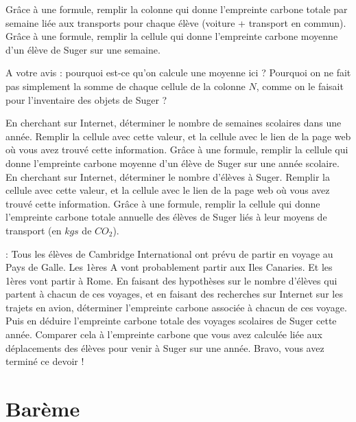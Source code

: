 \documentclass{exam}
\begin{document}
\begin{questions}
  \question Grâce à une formule, remplir la colonne  qui donne l'empreinte carbone totale par semaine liée aux transports pour chaque élève (voiture + transport en commun).
  \question Grâce à une formule, remplir la cellule  qui donne l'empreinte carbone moyenne d'un élève de Suger sur une semaine.
  \begin{Indication}
    A votre avis : pourquoi est-ce qu'on calcule une moyenne ici ? Pourquoi on ne fait pas simplement la somme de chaque cellule de la colonne $N$, comme on le faisait pour l'inventaire des objets de Suger ?
  \end{Indication}
\question En cherchant sur Internet, déterminer le nombre de semaines scolaires dans une année. Remplir la cellule  avec cette valeur, et la cellule  avec le lien de la page web où vous avez trouvé cette information.
\question Grâce à une formule, remplir la cellule  qui donne l'empreinte carbone moyenne d'un élève de Suger sur une année scolaire.
\question En cherchant sur Internet, déterminer le nombre d'élèves à Suger. Remplir la cellule  avec cette valeur, et la cellule  avec le lien de la page web où vous avez trouvé cette information.
\question Grâce à une formule, remplir la cellule  qui donne l'empreinte carbone totale annuelle des élèves de Suger liés à leur moyens de transport (en $kgs$ de $CO_2$).
  \end{questions}

  \begin{Indication}
   : Tous les élèves de Cambridge International ont prévu de partir en voyage au Pays de Galle. Les 1ères A vont probablement partir aux Iles Canaries. Et les 1ères vont partir à Rome. En faisant des hypothèses sur le nombre d'élèves qui partent à chacun de ces voyages, et en faisant des recherches sur Internet sur les trajets en avion, déterminer l'empreinte carbone associée à chacun de ces voyage. Puis en déduire l'empreinte carbone totale des voyages scolaires de Suger cette année. Comparer cela à l'empreinte carbone que vous avez calculée liée aux déplacements des élèves pour venir à Suger sur une année. Bravo, vous avez terminé ce devoir !
\end{Indication}

\section{Barème}
\end{document}
